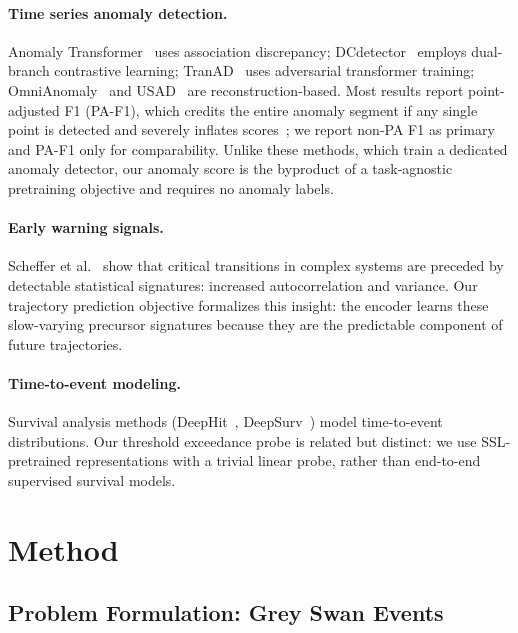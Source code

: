 \documentclass{article}
\begin{document}
\paragraph{Time series anomaly detection.}
Anomaly Transformer~\citep{xu2022anomalytransformer} uses association discrepancy; DCdetector~\citep{yang2023dcdetector} employs dual-branch contrastive learning; TranAD~\citep{tuli2022tranad} uses adversarial transformer training; OmniAnomaly~\citep{su2019omnianomaly} and USAD~\citep{audibert2020usad} are reconstruction-based. Most results report point-adjusted F1 (PA-F1), which credits the entire anomaly segment if any single point is detected and severely inflates scores~\citep{schmidl2022tsadeval}; we report non-PA F1 as primary and PA-F1 only for comparability. Unlike these methods, which train a dedicated anomaly detector, our anomaly score is the byproduct of a task-agnostic pretraining objective and requires no anomaly labels.

\paragraph{Early warning signals.}
Scheffer et al.~\citep{scheffer2009earlywarning} show that critical transitions in complex systems are preceded by detectable statistical signatures: increased autocorrelation and variance. Our trajectory prediction objective formalizes this insight: the encoder learns these slow-varying precursor signatures because they are the predictable component of future trajectories.

\paragraph{Time-to-event modeling.}
Survival analysis methods (DeepHit~\citep{lee2018deephit}, DeepSurv~\citep{katzman2018deepsurv}) model time-to-event distributions. Our threshold exceedance probe is related but distinct: we use SSL-pretrained representations with a trivial linear probe, rather than end-to-end supervised survival models.

\section{Method}
\label{sec:method}

\subsection{Problem Formulation: Grey Swan Events}
\label{sec:problem}
\end{document}
